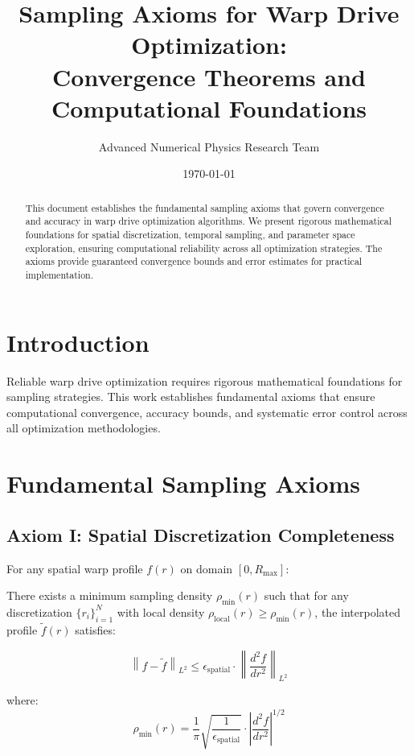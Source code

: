 \documentclass[12pt,a4paper]{article}
\title{Sampling Axioms for Warp Drive Optimization:\\Convergence Theorems and Computational Foundations}
\author{Advanced Numerical Physics Research Team}
\date{\today}
\begin{document}
\maketitle

\begin{abstract}
This document establishes the fundamental sampling axioms that govern convergence and accuracy in warp drive optimization algorithms. We present rigorous mathematical foundations for spatial discretization, temporal sampling, and parameter space exploration, ensuring computational reliability across all optimization strategies. The axioms provide guaranteed convergence bounds and error estimates for practical implementation.
\end{abstract}

\section{Introduction}

Reliable warp drive optimization requires rigorous mathematical foundations for sampling strategies. This work establishes fundamental axioms that ensure computational convergence, accuracy bounds, and systematic error control across all optimization methodologies.

\section{Fundamental Sampling Axioms}

\subsection{Axiom I: Spatial Discretization Completeness}

For any spatial warp profile $f(r)$ on domain $[0, R_{\text{max}}]$:

\begin{axiom}
There exists a minimum sampling density $\rho_{\text{min}}(r)$ such that for any discretization $\{r_i\}_{i=1}^N$ with local density $\rho_{\text{local}}(r) \geq \rho_{\text{min}}(r)$, the interpolated profile $\tilde{f}(r)$ satisfies:

\begin{equation}
\left\|f - \tilde{f}\right\|_{L^2} \leq \epsilon_{\text{spatial}} \cdot \left\|\frac{d^2 f}{dr^2}\right\|_{L^2}
\end{equation}

where:
\begin{equation}
\rho_{\text{min}}(r) = \frac{1}{\pi} \sqrt{\frac{1}{\epsilon_{\text{spatial}}}} \cdot \left|\frac{d^2 f}{dr^2}\right|^{1/2}
\end{equation}
\end{axiom}
\end{document}
